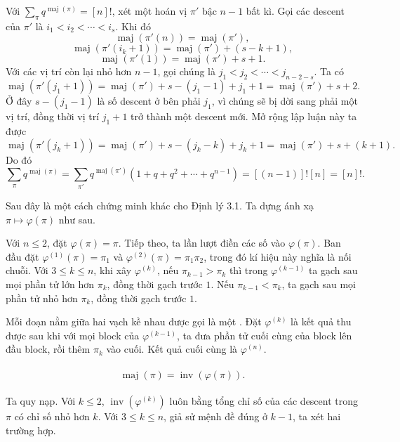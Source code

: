 \documentclass[11pt]{article}
\begin{document}
Với \(\sum_{\pi}q^{\operatorname{maj}(\pi)}=[n]!\), xét một hoán vị
\(\pi'\) bậc \(n-1\) bất kì. Gọi các descent của \(\pi'\) là
\(i_1<i_2<\cdots<i_s\). Khi đó
\[
  \operatorname{maj}(\pi'(n))=\operatorname{maj}(\pi'),
\]
\[
  \operatorname{maj}(\pi'(i_k+1))
  =\operatorname{maj}(\pi')+(s-k+1),
\]
\[
  \operatorname{maj}(\pi'(1))=\operatorname{maj}(\pi')+s+1.
\]
Với các vị trí còn lại nhỏ hơn \(n-1\), gọi chúng là
\(j_1<j_2<\cdots<j_{n-2-s}\). Ta có
\[
  \operatorname{maj}(\pi'(j_1+1))
  =\operatorname{maj}(\pi')+s-(j_1-1)+j_1+1
  =\operatorname{maj}(\pi')+s+2.
\]
Ở đây \(s-(j_1-1)\) là số descent ở bên phải \(j_1\), vì chúng sẽ bị dời sang
phải một vị trí, đồng thời vị trí \(j_1+1\) trở thành một descent mới. Mở rộng
lập luận này ta được
\[
  \operatorname{maj}(\pi'(j_k+1))
  =\operatorname{maj}(\pi')+s-(j_k-k)+j_k+1
  =\operatorname{maj}(\pi')+s+(k+1).
\]
Do đó
\[
  \sum_{\pi}q^{\operatorname{maj}(\pi)}
  =\sum_{\pi'}q^{\operatorname{maj}(\pi')}
    (1+q+q^2+\cdots+q^{n-1})
  =[(n-1)]![n]=[n]!.
\]


Sau đây là một cách chứng minh khác cho Định lý 3.1. Ta dựng ánh xạ
\(\pi\mapsto\varphi(\pi)\) như sau.

Với \(n\le2\), đặt \(\varphi(\pi)=\pi\). Tiếp theo, ta lần lượt điền các số
vào \(\varphi(\pi)\). Ban đầu đặt
\(\varphi^{(1)}(\pi)=\pi_1\) và \(\varphi^{(2)}(\pi)=\pi_1\pi_2\), trong đó
kí hiệu này nghĩa là nối chuỗi. Với \(3\le k\le n\), khi xây
\(\varphi^{(k)}\), nếu \(\pi_{k-1}>\pi_k\) thì trong
\(\varphi^{(k-1)}\) ta gạch sau mọi phần tử lớn hơn \(\pi_k\), đồng thời gạch
trước \(1\). Nếu \(\pi_{k-1}<\pi_k\), ta gạch sau mọi phần tử nhỏ hơn
\(\pi_k\), đồng thời gạch trước \(1\).

Mỗi đoạn nằm giữa hai vạch kề nhau được gọi là một . Đặt
\(\varphi^{(k)}\) là kết quả thu được sau khi với mọi block của
\(\varphi^{(k-1)}\), ta đưa phần tử cuối cùng của block lên đầu block, rồi
thêm \(\pi_k\) vào cuối. Kết quả cuối cùng là \(\varphi^{(n)}\).

\paragraph{}
\[
  \operatorname{maj}(\pi)=\operatorname{inv}(\varphi(\pi)).
\]

\paragraph{}
Ta quy nạp. Với \(k\le2\), \(\operatorname{inv}(\varphi^{(k)})\) luôn bằng
tổng chỉ số của các descent trong \(\pi\) có chỉ số nhỏ hơn \(k\). Với
\(3\le k\le n\), giả sử mệnh đề đúng ở \(k-1\), ta xét hai trường hợp.
\end{document}
